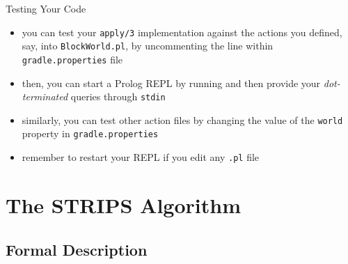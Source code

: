 \documentclass[presentation]{beamer}\mode<presentation>{\usetheme{AMSBolognaFC}}
\begin{document}
\begin{frame}[c]{Testing Your Code}

	\begin{itemize}
		\item you can test your \texttt{apply/3} implementation against the actions you defined, say, into \texttt{BlockWorld.pl}, by uncommenting the line
		within \texttt{gradle.properties} file

		\vfill

		\item then, you can start a Prolog REPL by running
		and then provide your \emph{dot-terminated} queries through \texttt{stdin}

		\vfill

		\item similarly, you can test other action files by changing the value of the \texttt{world} property in \texttt{gradle.properties}

		\vfill

		\item remember to restart your REPL if you edit any \texttt{.pl} file
	\end{itemize}

\end{frame}


\section{The STRIPS Algorithm}

\subsection{Formal Description}
\end{document}
